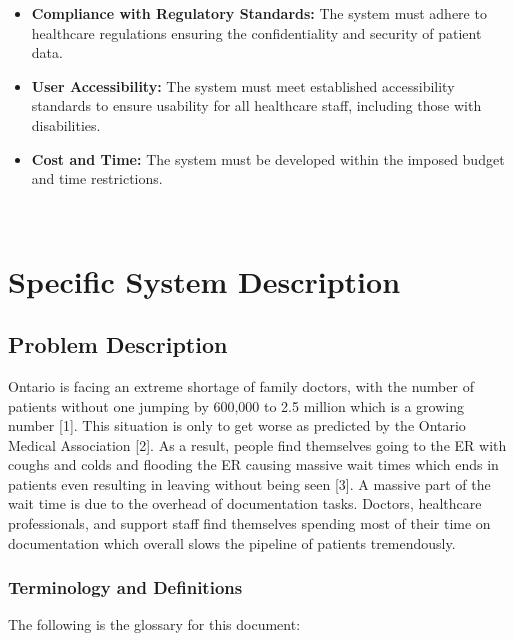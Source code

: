\documentclass[12pt]{article}
\begin{document}
\begin{itemize} 

  \item \textbf{Compliance with Regulatory Standards:} The system must adhere to healthcare regulations ensuring the confidentiality and security of patient data.

  \item \textbf{User Accessibility:} The system must meet established accessibility standards to ensure usability for all healthcare staff, including those with disabilities.

  \item \textbf{Cost and Time:} The system must be developed within the imposed budget and time restrictions.

\end{itemize}


~\newpage

\section{Specific System Description} \label{sec_SpecificSystemDescription}


\subsection{Problem Description} \label{sec_ProblemDescription}

Ontario is facing an extreme shortage of family doctors, with the number of patients without one jumping by 600,000 to 2.5 million which is a growing number [1]. This situation is only to get worse as predicted by the Ontario Medical Association [2]. As a result, people find themselves going to the ER with coughs and colds and flooding the ER causing massive wait times which ends in patients even resulting in leaving without being seen [3]. A massive part of the wait time is due to the overhead of documentation tasks. Doctors, healthcare professionals, and support staff find themselves spending most of their time on documentation which overall slows the pipeline of patients tremendously.


\subsubsection{Terminology and Definitions} \label{sec_TerminologyDefinitions}

The following is the glossary for this document:
\end{document}
